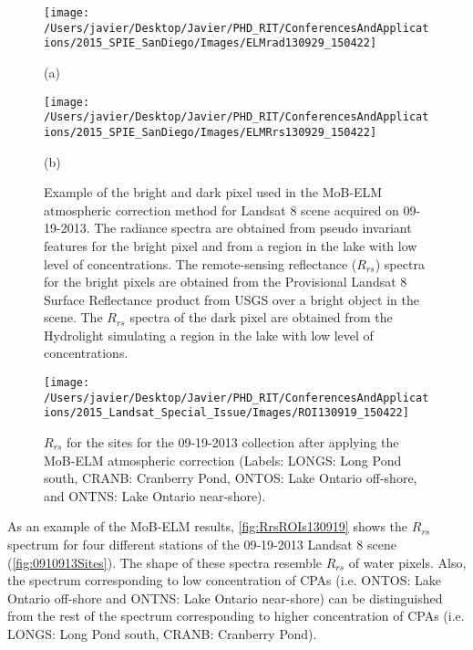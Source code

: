 \begin{figure}[htb]
  \begin{minipage}[c]{0.48\linewidth}
    \centering
      \texttt{[image: /Users/javier/Desktop/Javier/PHD\_RIT/ConferencesAndApplications/2015\_SPIE\_SanDiego/Images/ELMrad130929\_150422]}
    \centerline{(a)}\medskip
  \end{minipage}
  \hfill
  \begin{minipage}[d]{0.48\linewidth}
    \centering
      \texttt{[image: /Users/javier/Desktop/Javier/PHD\_RIT/ConferencesAndApplications/2015\_SPIE\_SanDiego/Images/ELMRrs130929\_150422]}
    \centerline{(b)}\medskip
  \end{minipage}
  \caption{Example of the bright and dark pixel used in the MoB-ELM atmospheric correction method for Landsat 8 scene acquired on 09-19-2013. The radiance spectra are obtained from pseudo invariant features for the bright pixel and from a region in the lake with low level of concentrations. The remote-sensing reflectance ($R_{rs}$) spectra for the bright pixels are obtained from the Provisional Landsat 8 Surface Reflectance product from USGS over a bright object in the scene. The $R_{rs}$ spectra of the dark pixel are obtained from the Hydrolight simulating a region in the lake with low level of concentrations.\label{fig:MOBELMpxls} } 
\end{figure}

\begin{figure}[htbp!]
  \centering
  \texttt{[image: /Users/javier/Desktop/Javier/PHD\_RIT/ConferencesAndApplications/2015\_Landsat\_Special\_Issue/Images/ROI130919\_150422]}
  \caption{$R_{rs}$ for the sites for the 09-19-2013 collection after applying the MoB-ELM atmospheric correction (Labels: LONGS: Long Pond south, CRANB: Cranberry Pond, ONTOS: Lake Ontario off-shore, and ONTNS: Lake Ontario near-shore).\label{fig:RrsROIs130919} } 
\end{figure}

As an example of the MoB-ELM results, \autoref{fig:RrsROIs130919} shows the $R_{rs}$ spectrum for four different stations of the 09-19-2013 Landsat 8 scene (\autoref{fig:0910913Sites}). The shape of these spectra resemble $R_{rs}$ of water pixels. Also, the spectrum corresponding to low concentration of CPAs (i.e. ONTOS: Lake Ontario off-shore and ONTNS: Lake Ontario near-shore) can be distinguished from the rest of the spectrum corresponding to higher concentration of CPAs (i.e. LONGS: Long Pond south, CRANB: Cranberry Pond).


